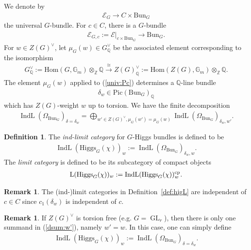 \documentclass [11pt,oneside,a4paper,mathscr]{amsart}
\theoremstyle{definition}
\newtheorem{defn}[thm]{Definition}
\newtheorem{remark}[thm]{Remark}
\newcommand{\LL}{\operatorname{L}}
\newcommand{\IndL}{\operatorname{IndL}}
\newcommand{\GL}{\operatorname{GL}}
\newcommand{\Hig}{\mathrm{Higgs}}
\newcommand{\Bun}{\mathrm{Bun}}
\begin{document}
We denote by 
\begin{align}\label{univ:E}
\mathscr{E}_G \to C\times \Bun_G
\end{align}
the universal $G$-bundle. 
For $c\in C$, there is a $G$-bundle 
\begin{align}\label{univ:Pc}
    \mathscr{E}_{G, c}:=\mathscr{E}|_{c\times \Bun_G} \to \Bun_G. 
\end{align}
For $w\in Z(G)^{\vee}$, let $\mu_G(w)\in G^{\vee}_{\mathbb{Q}}$ be the associated element 
corresponding to the isomorphism 
\begin{align*}G^{\vee}_{\mathbb{Q}} :=\text{Hom}(G,\mathbb{G}_m)\otimes_\mathbb{Z}\mathbb{Q}  \stackrel{\cong}{\to} Z(G)_{\mathbb{Q}}^{\vee}:=\text{Hom}(Z(G),\mathbb{G}_m)\otimes_\mathbb{Z}\mathbb{Q}.
\end{align*}
The element $\mu_G(w)$ applied to (\ref{univ:Pc})
determines a $\mathbb{Q}$-line bundle 
\begin{align}\label{deltaw}
    \delta_w \in \mathrm{Pic}(\Bun_G)_{\mathbb{Q}} 
\end{align}
which has $Z(G)$-weight $w$ up to torsion. 
We have the finite decomposition 
\begin{align}\label{dsum:w'}
    \IndL(\Omega_{\Bun_G})_{\delta=\delta_w}=
    \bigoplus_{w'\in Z(G)^{\vee}, \mu_G(w')=\mu_G(w)}
    \IndL(\Omega_{\Bun_G})_{\delta_w, w'}. 
\end{align}
\begin{defn}\label{def:indlim:Higgs}
The \textit{ind-limit category} for $G$-Higgs bundles is defined to be 
\begin{align}\label{def:higL}
    \IndL(\Hig_G(\chi))_w:=\IndL(\Omega_{\Bun_G})_{\delta_w, w}. 
\end{align}
The \textit{limit category} is defined to be its subcategory of compact objects
\begin{align}\notag
    \LL(\Hig_G(\chi))_w:= \IndL(\Hig_G(\chi))_w^{\mathrm{cp}}.
\end{align}
\end{defn}
\begin{remark}\label{rmk:ind:c}
The (ind-)limit categories in Definition~\ref{def:higL} are independent of $c\in C$ since 
$c_1(\delta_w)$ is independent of $c$. 
\end{remark}
\begin{remark}
    If $Z(G)^{\vee}$ is torsion free (e.g. $G=\GL_r$), then there is only one summand in (\ref{dsum:w'}),
    namely $w'=w$. In this case, one can simply define 
    \begin{align*}
          \IndL(\Hig_G(\chi))_w:=\IndL(\Omega_{\Bun_G})_{\delta=\delta_w}. 
    \end{align*}
\end{remark}
\end{document}
